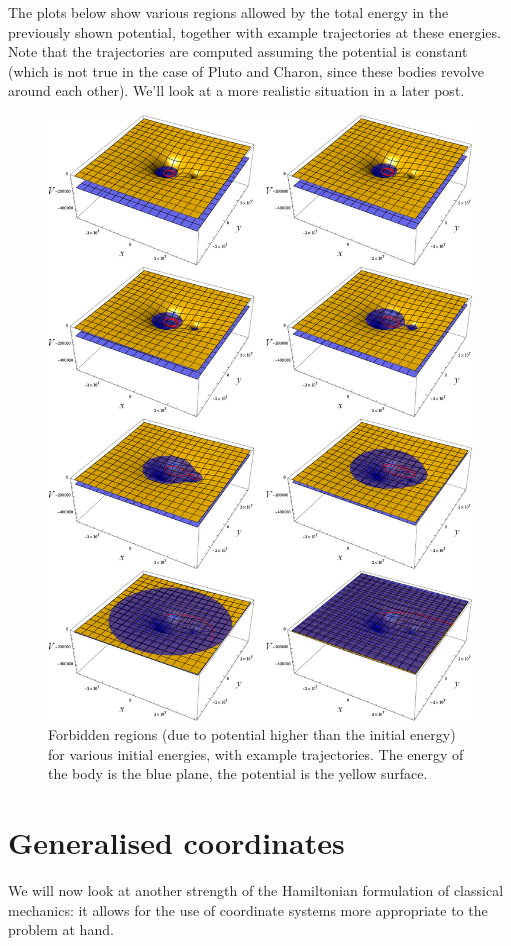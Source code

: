 \documentclass[10pt, a4paper, twoside]{basestyle}
\begin{document}
The plots below show various regions allowed by the total energy in the
previously shown potential, together with example trajectories at these
energies. Note that the trajectories are computed assuming the potential is
constant (which is not true in the case of Pluto and Charon, since these bodies
revolve around each other). We'll look at a more realistic situation in a later
post.
\begin{figure}
\includegraphics[scale=0.40]{rising-energy.png}
\caption{Forbidden regions (due to potential higher than the initial energy) for
various initial energies, with example trajectories. The energy of the body is
the blue plane, the potential is the yellow surface.}
\end{figure}

\section{Generalised coordinates}
We will now look at another strength of the Hamiltonian formulation of classical
mechanics: it allows for the use of coordinate systems more appropriate to the
problem at hand.
\end{document}
